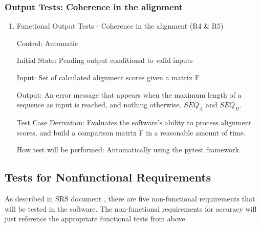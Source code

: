 \documentclass[12pt, titlepage]{article}
\begin{document}
\subsubsection{Output Tests: Coherence in the alignment}
\begin{enumerate}

\item{Functional Output Tests - Coherence in the alignment (R4 \& R5)\\}

Control: Automatic
					
Initial State: Pending output conditional to valid inputs
					
Input: Set of calculated alignment scores given a matrix F
					
Output: An error message that appears when the maximum length of a sequence as input is reached, and nothing otherwise.
 $SEQ_A$ and $SEQ_B$.

Test Case Derivation: Evaluates the software's ability to process alignment scores, and build a comparison matrix F in 
a reasonable amount of time.


How test will be performed: Automatically using the pytest framework.


\end{enumerate}


\subsection{Tests for Nonfunctional Requirements}

As described in \progname{} SRS document \citet{SRS}, there are five non-functional requirements
that will be tested in the software. The non-functional requirements for accuracy will just reference the
appropriate functional tests from above.



\end{document}

